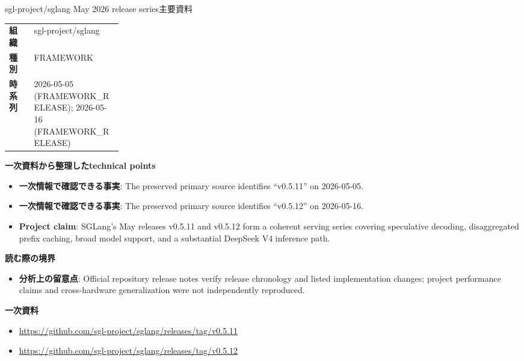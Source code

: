 \begin{technicalnote}{sgl-project/sglang May 2026 release series}{主要資料}
\begin{tabularx}{\linewidth}{@{}>{\bfseries}p{0.22\linewidth}X@{}}
組織 & sgl-project/sglang \\
種別 & FRAMEWORK \\
時系列 & 2026-05-05 (FRAMEWORK\_RELEASE); 2026-05-16 (FRAMEWORK\_RELEASE) \\
\end{tabularx}
\smallskip
{\bfseries 一次資料から整理したtechnical points}
\begin{itemize}[leftmargin=1.5em,itemsep=0.35em]
\item \textbf{一次情報で確認できる事実}: The preserved primary source identifies “v0.5.11” on 2026-05-05.
\item \textbf{一次情報で確認できる事実}: The preserved primary source identifies “v0.5.12” on 2026-05-16.
\item \textbf{Project claim}: SGLang's May releases v0.5.11 and v0.5.12 form a coherent serving series covering speculative decoding, disaggregated prefix caching, broad model support, and a substantial DeepSeek V4 inference path.
\end{itemize}
{\bfseries 読む際の境界}
\begin{itemize}[leftmargin=1.5em,itemsep=0.35em]
\item \textbf{分析上の留意点}: Official repository release notes verify release chronology and listed implementation changes; project performance claims and cross-hardware generalization were not independently reproduced.
\end{itemize}
{\bfseries 一次資料}
\begingroup\sloppy
\begin{itemize}[leftmargin=1.5em,itemsep=0.25em]
\item {\scriptsize\url{https://github.com/sgl-project/sglang/releases/tag/v0.5.11}}
\item {\scriptsize\url{https://github.com/sgl-project/sglang/releases/tag/v0.5.12}}
\end{itemize}
\endgroup
\end{technicalnote}
\medskip

